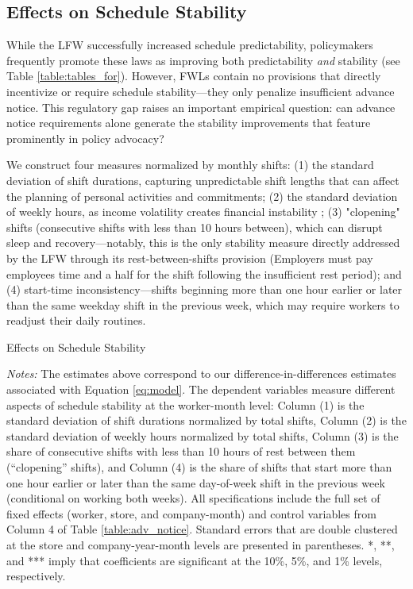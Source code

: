 \documentclass[letterpaper,11pt,leqno]{article}
\theoremstyle{paper}
\newcommand{\note}[2][]{\parbox{\textwidth}{\footnotesize\vspace*{10pt}\textit{#1}#2}}
\begin{document}
\subsection{Effects on Schedule Stability} \label{subsec:predict_stability}

While the LFW successfully increased schedule predictability, policymakers frequently promote these laws as improving both predictability \textit{and} stability (see Table \ref{table:tables_for}). However, FWLs contain no provisions that directly incentivize or require schedule stability—they only penalize insufficient advance notice. This regulatory gap raises an important empirical question: can advance notice requirements alone generate the stability improvements that feature prominently in policy advocacy?

We construct four measures normalized by monthly shifts: (1) the standard deviation of shift durations, capturing unpredictable shift lengths that can affect the planning of personal activities and commitments; (2) the standard deviation of weekly hours, as income volatility creates financial instability \citep{Lambert218, schneider2019consequences}; (3) "clopening" shifts (consecutive shifts with less than 10 hours between), which can disrupt sleep and recovery—notably, this is the only stability measure directly addressed by the LFW through its rest-between-shifts provision (Employers must pay employees time and a half for the shift following the insufficient rest period); and (4) start-time inconsistency—shifts beginning more than one hour earlier or later than the same weekday shift in the previous week, which may require workers to readjust their daily routines.




\begin{singlespace}
\begin{table}[h]
\caption{Effects on Schedule Stability}

\note{\textit{Notes: } \scriptsize The estimates above correspond to our difference-in-differences estimates associated with Equation \ref{eq:model}. The dependent variables measure different aspects of schedule stability at the worker-month level: Column (1) is the standard deviation of shift durations normalized by total shifts, Column (2) is the standard deviation of weekly hours normalized by total shifts, Column (3) is the share of consecutive shifts with less than 10 hours of rest between them (``clopening'' shifts), and Column (4) is the share of shifts that start more than one hour earlier or later than the same day-of-week shift in the previous week (conditional on working both weeks). All specifications include the full set of fixed effects (worker, store, and company-month) and control variables from Column 4 of Table \ref{table:adv_notice}. Standard errors that are double clustered at the store and company-year-month levels are presented in parentheses. *, **, and *** imply that coefficients are significant at the 10\%, 5\%, and 1\% levels, respectively.}
\label{table:stab_regs}
\end{table}
\end{singlespace}
\end{document}
